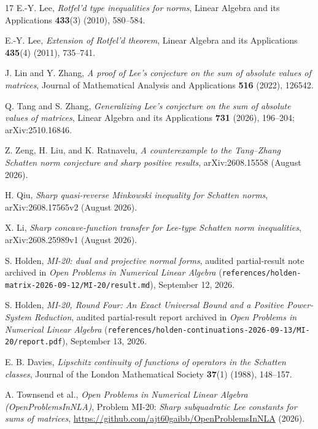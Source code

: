 \documentclass[10pt,letterpaper]{article}
\begin{document}
\begin{thebibliography}{17}
\small
{}
E.-Y. Lee, \emph{Rotfel'd type inequalities for norms}, Linear Algebra and its Applications \textbf{433}(3) (2010), 580--584.

E.-Y. Lee, \emph{Extension of Rotfel'd theorem}, Linear Algebra and its Applications \textbf{435}(4) (2011), 735--741.

J. Lin and Y. Zhang, \emph{A proof of Lee's conjecture on the sum of absolute values of matrices}, Journal of Mathematical Analysis and Applications \textbf{516} (2022), 126542.

Q. Tang and S. Zhang, \emph{Generalizing Lee's conjecture on the sum of absolute values of matrices}, Linear Algebra and its Applications \textbf{731} (2026), 196--204; arXiv:2510.16846.

Z. Zeng, H. Liu, and K. Ratnavelu, \emph{A counterexample to the Tang--Zhang Schatten norm conjecture and sharp positive results}, arXiv:2608.15558 (August 2026).

H. Qiu, \emph{Sharp quasi-reverse Minkowski inequality for Schatten norms}, arXiv:2608.17565v2 (August 2026).

X. Li, \emph{Sharp concave-function transfer for Lee-type Schatten norm inequalities}, arXiv:2608.25989v1 (August 2026).

S. Holden, \emph{MI-20: dual and projective normal forms}, audited partial-result note archived in \emph{Open Problems in Numerical Linear Algebra} (\nolinkurl{references/holden-matrix-2026-09-12/MI-20/result.md}), September 12, 2026.

S. Holden, \emph{MI-20, Round Four: An Exact Universal Bound and a Positive Power-System Reduction}, audited partial-result report archived in \emph{Open Problems in Numerical Linear Algebra} (\nolinkurl{references/holden-continuations-2026-09-13/MI-20/report.pdf}), September 13, 2026.

E. B. Davies, \emph{Lipschitz continuity of functions of operators in the Schatten classes}, Journal of the London Mathematical Society \textbf{37}(1) (1988), 148--157.

A. Townsend et al., \emph{Open Problems in Numerical Linear Algebra (OpenProblemsInNLA)}, Problem MI-20: \emph{Sharp subquadratic Lee constants for sums of matrices}, \url{https://github.com/ajt60gaibb/OpenProblemsInNLA} (2026).


\end{thebibliography}
\end{document}
